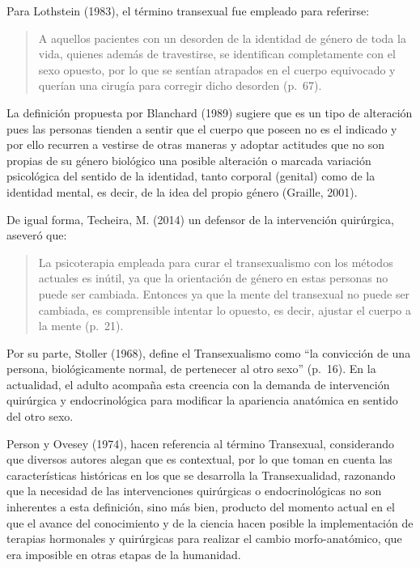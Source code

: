 Para Lothstein (1983), el término transexual fue empleado para referirse:

\begin{quote}
    A aquellos pacientes con un desorden de la identidad de género de toda la
    vida, quienes además de travestirse, se identifican completamente con el sexo
    opuesto, por lo que se sentían atrapados en el cuerpo equivocado y querían una
    cirugía para corregir dicho desorden (p.~67).
\end{quote}

La definición propuesta por Blanchard (1989) sugiere que es un tipo de
alteración pues las personas tienden a sentir que el cuerpo que poseen no es el
indicado y por ello recurren a vestirse de otras maneras y adoptar actitudes que
no son propias de su género biológico una posible alteración o marcada variación
psicológica del sentido de la identidad, tanto corporal (genital) como de la
identidad mental, es decir, de la idea del propio género (Graille, 2001).

De igual forma, Techeira, M. (2014) un defensor de la intervención quirúrgica,
aseveró que:

\begin{quote}
    La psicoterapia empleada para curar el transexualismo con los métodos
    actuales es inútil, ya que la orientación de género en estas personas no puede
    ser cambiada.
    Entonces ya que la mente del transexual no puede ser cambiada, es comprensible
    intentar lo opuesto, es decir, ajustar el cuerpo a la mente (p.~21).
\end{quote}

Por su parte, Stoller (1968), define el Transexualismo como “la convicción de
una persona, biológicamente normal, de pertenecer al otro sexo” (p.~16).
En la actualidad, el adulto acompaña esta creencia con la demanda de
intervención quirúrgica y endocrinológica para modificar la apariencia anatómica
en sentido del otro sexo.

Person y Ovesey (1974), hacen referencia al término Transexual, considerando que
diversos autores alegan que es contextual, por lo que toman en cuenta las
características históricas en los que se desarrolla la Transexualidad, razonando
que la necesidad de las intervenciones quirúrgicas o endocrinológicas no son
inherentes a esta definición, sino más bien, producto del momento actual en el
que el avance del conocimiento y de la ciencia hacen posible la implementación
de terapias hormonales y quirúrgicas para realizar el cambio morfo-anatómico,
que era imposible en otras etapas de la humanidad.

